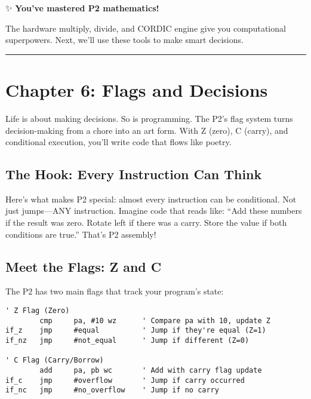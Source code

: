 \documentclass[11pt]{book}
\begin{document}
\begin{chapterend}
✨ \textbf{You've mastered P2 mathematics!}

The hardware multiply, divide, and CORDIC engine give you computational superpowers. Next, we'll use these tools to make smart decisions.
\end{chapterend}

\begin{center}\rule{0.5\linewidth}{0.5pt}\end{center}

\hypertarget{chapter-6-flags-and-decisions}{%
\section{Chapter 6: Flags and
Decisions}\label{chapter-6-flags-and-decisions}}

Life is about making decisions. So is programming. The P2's flag system
turns decision-making from a chore into an art form. With Z (zero), C
(carry), and conditional execution, you'll write code that flows like
poetry.

\hypertarget{the-hook-every-instruction-can-think}{%
\subsection{The Hook: Every Instruction Can
Think}\label{the-hook-every-instruction-can-think}}

Here's what makes P2 special: almost every instruction can be
conditional. Not just jumps---ANY instruction. Imagine code that reads
like: ``Add these numbers if the result was zero. Rotate left if there
was a carry. Store the value if both conditions are true.'' That's P2
assembly!

\hypertarget{meet-the-flags-z-and-c}{%
\subsection{Meet the Flags: Z and C}\label{meet-the-flags-z-and-c}}

The P2 has two main flags that track your program's state:

\begin{lstlisting}
' Z Flag (Zero)
        cmp     pa, #10 wz      ' Compare pa with 10, update Z
if_z    jmp     #equal          ' Jump if they're equal (Z=1)
if_nz   jmp     #not_equal      ' Jump if different (Z=0)

' C Flag (Carry/Borrow)
        add     pa, pb wc       ' Add with carry flag update
if_c    jmp     #overflow       ' Jump if carry occurred
if_nc   jmp     #no_overflow    ' Jump if no carry
\end{lstlisting}
\end{document}
